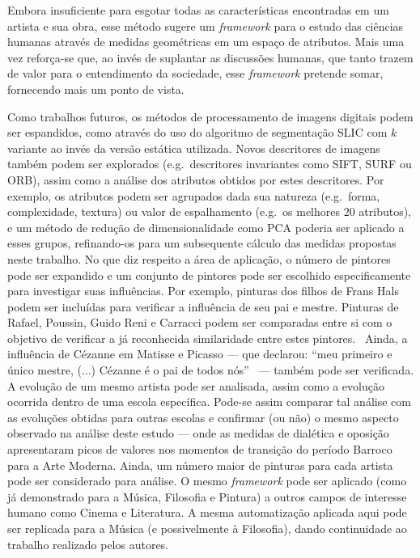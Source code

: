 Embora insuficiente para esgotar todas as características encontradas
em um artista e sua obra, esse método sugere um \textit{framework}
para o estudo das ciências humanas através de medidas geométricas em
um espaço de atributos. Mais uma vez reforça-se que, ao invés de
suplantar as discussões humanas, que tanto trazem de valor para o
entendimento da sociedade, esse \textit{framework} pretende somar,
fornecendo mais um ponto de vista.

Como trabalhos futuros, os métodos de processamento de imagens digitais podem
ser espandidos, como através do uso do algoritmo de segmentação SLIC com $k$ variante ao invés da
versão estática utilizada. Novos descritores de imagens também podem ser explorados (e.g.\ descritores invariantes como SIFT, SURF ou ORB),
assim como a análise dos atributos obtidos por estes descritores. Por exemplo, os atributos podem ser agrupados dada sua natureza (e.g.\ forma, complexidade, textura) ou valor de espalhamento (e.g.\ os melhores 20 atributos), e um método de redução de dimensionalidade como PCA poderia ser aplicado a esses grupos, refinando-os para um subsequente cálculo das medidas propostas neste trabalho. No que diz respeito a área de aplicação, o número de pintores pode ser expandido e um
conjunto de pintores pode ser escolhido especificamente para
investigar suas influências. Por exemplo, pinturas dos filhos de Frans
Hals podem ser incluídas para verificar a influência de seu pai e
mestre. Pinturas de Rafael, Poussin, Guido Reni e
Carracci podem ser comparadas entre si com o objetivo de verificar a
já reconhecida similaridade entre estes pintores.~\cite{gombrich} Ainda, a influência
de Cézanne em Matisse e Picasso --- que declarou: ``meu primeiro e
único mestre, (...) Cézanne é o pai de todos nós''~\cite{rishel} ---
também pode ser verificada. A evolução de um mesmo artista pode ser
analisada, assim como a evolução ocorrida dentro de uma escola
específica. Pode-se assim comparar tal análise com as evoluções
obtidas para outras escolas e confirmar (ou não) o mesmo aspecto
observado na análise deste estudo --- onde as medidas de dialética e
oposição apresentaram picos de valores nos momentos de transição do
período Barroco para a Arte Moderna. Ainda, um número maior de
pinturas para cada artista pode ser considerado para análise. O mesmo
\textit{framework} pode ser aplicado (como já demonstrado para a
Música, Filosofia e Pintura) a outros campos de interesse humano como
Cinema e Literatura. A mesma automatização aplicada aqui pode ser
replicada para a Música (e possivelmente à Filosofia), dando
continuidade ao trabalho realizado pelos autores.~\cite{vieira}


